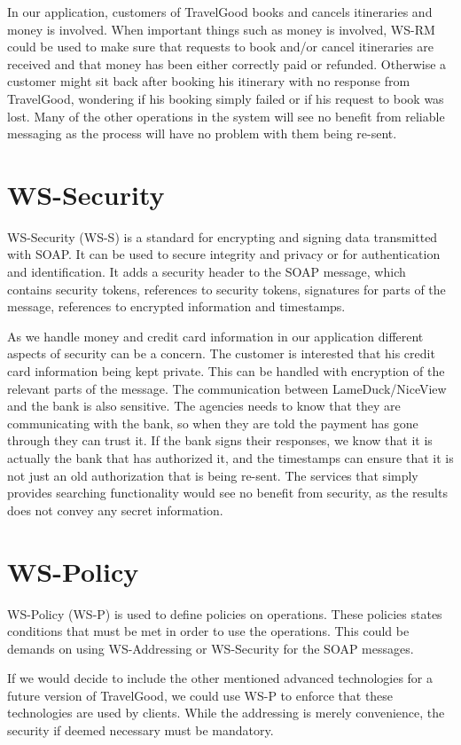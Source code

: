 In our application, customers of TravelGood books and cancels itineraries and money is involved. When important things such as money is involved, WS-RM could be used to make sure that requests to book and/or cancel itineraries are received and that money has been either correctly paid or refunded. Otherwise a customer might sit back after booking his itinerary with no response from TravelGood, wondering if his booking simply failed or if his request to book was lost. Many of the other operations in the system will see no benefit from reliable messaging as the process will have no problem with them being re-sent.


\section{WS-Security}
WS-Security (WS-S) is a standard for encrypting and signing data transmitted with SOAP. It can be used to secure integrity and privacy or for authentication and identification. It adds a security header to the SOAP message, which contains security tokens, references to security tokens, signatures for parts of the message, references to encrypted information and timestamps.

As we handle money and credit card information in our application different aspects of security can be a concern. The customer is interested that his credit card information being kept private. This can be handled with encryption of the relevant parts of the message. The communication between LameDuck/NiceView and the bank is also sensitive. The agencies needs to know that they are communicating with the bank, so when they are told the payment has gone through they can trust it. If the bank signs their responses, we know that it is actually the bank that has authorized it, and the timestamps can ensure that it is not just an old authorization that is being re-sent. The services that simply provides searching functionality would see no benefit from security, as the results does not convey any secret information.

\section{WS-Policy}
WS-Policy (WS-P) is used to define policies on operations. These policies states conditions that must be met in order to use the operations. This could be demands on using WS-Addressing or WS-Security for the SOAP messages.

If we would decide to include the other mentioned advanced technologies for a future version of TravelGood, we could use WS-P to enforce that these technologies are used by clients. While the addressing is merely convenience, the security if deemed necessary must be mandatory.




